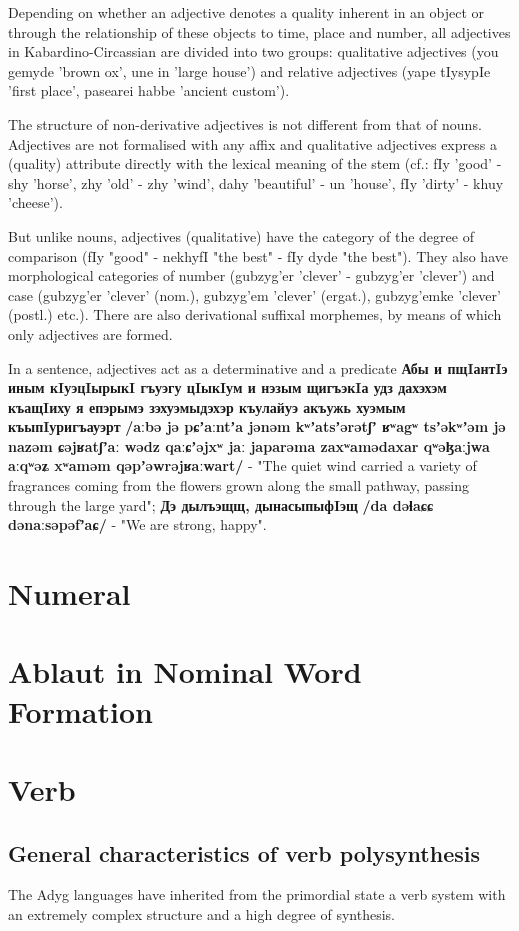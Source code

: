 \documentclass[a4paper,12pt]{book}
\newcommand{\1}[1]{\textbf{\emph{#1}}} %
\newcommand{\2}[1]{\textbf{[#1]}} %
\newcommand{\3}[1]{\fontsize{11pt}{0cm}\textbf{\emph{#1}}} %
\newcommand{\4}[1]{\fontsize{10pt}{0cm}\emph{#1}}	%
\newcommand{\5}[1]{\textbf{/#1/}} %
\newcommand{\6}[1]{\textbf{[#1]}} %
\newcommand{\7}[1]{\fontsize{12pt}{0cm}\emph{#1}} %
\newcommand{\8}[1]{\fontsize{12pt}{0cm}`#1'} %
\newcommand{\9}[1]{\fontsize{12pt}{0cm}(lit. `#1')} %
\newcommand{\glossphonemics}[1]{\textbf{/#1/}} %
\begin{document}
Depending on whether an adjective denotes a quality inherent in an object or through the relationship of these objects to time, place and number, all adjectives in Kabardino-Circassian are divided into two groups: qualitative adjectives (you gemyde 'brown ox', une in 'large house') and relative adjectives (yape tIysypIe 'first place', pasearei habbe 'ancient custom').

The structure of non-derivative adjectives is not different from that of nouns. Adjectives are not formalised with any affix and qualitative adjectives express a (quality) attribute directly with the lexical meaning of the stem (cf.: fIy 'good' - shy 'horse', zhy 'old' - zhy 'wind', dahy 'beautiful' - un 'house', fIy 'dirty' - khuy 'cheese').

But unlike nouns, adjectives (qualitative) have the category of the degree of comparison (fIy "good" - nekhyfI "the best" - fIy dyde "the best"). They also have morphological categories of number (gubzyg'er 'clever' - gubzyg'er 'clever') and case (gubzyg'er 'clever' (nom.), gubzyg'em 'clever' (ergat.), gubzyg'emke 'clever' (postl.) etc.). There are also derivational suffixal morphemes, by means of which only adjectives are formed.

In a sentence, adjectives act as a determinative and a predicate \textbf{Абы и пщIантIэ иным кIуэцIырыкI гъуэгу цIыкIум и нэзым щигъэкIа удз дахэхэм къащIиху я епэрымэ зэхуэмыдэхэр къулайуэ акъужь хуэмым къыпIуригъауэрт} \glossphonemics{aːbə jə pɕʼaːntʼa jənəm kʷʼatsʼərətʃʼ ʁʷagʷ tsʼəkʷʼəm jə nazəm ɕəjʁatʃʼaː wədz qaːɕʼəjxʷ jaː japarəma zaxʷamədaxar qʷəɮaːjwa aːqʷəʑ xʷaməm qəpʼəwrəjʁaːwart} - "The quiet wind carried a variety of fragrances coming from the flowers grown along the small pathway, passing through the large yard"; \textbf{Дэ дылъэщщ, дынасыпыфIэщ} \glossphonemics{da dəɬaɕɕ dənaːsəpəfʼaɕ} - "We are strong, happy".
\section{Numeral}
\section{Ablaut in Nominal Word Formation}
\section{Verb}
\subsection{General characteristics of verb polysynthesis}
The Adyg languages have inherited from the primordial state a verb system with an extremely complex structure and a high degree of synthesis.
\end{document}
